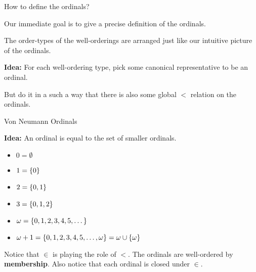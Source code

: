 \documentclass[pdf,final]{prosper}
\newcommand{\skipsmall}{\vspace{1em}}
\begin{document}
\begin{slide}{How to define the ordinals?}

Our immediate goal is to give a precise definition of the ordinals.

\skipsmall

The order-types of the well-orderings are arranged just like our intuitive
picture of the ordinals.

\skipsmall

\textbf{Idea:} For each well-ordering type, pick some canonical representative
to be an ordinal.

\skipsmall

But do it in a such a way that there is also some global $<$ relation on the ordinals.


\end{slide}

\begin{slide}{Von Neumann Ordinals}

\textbf{Idea:} An ordinal is equal to the set of smaller ordinals.


\begin{itemize}
  \item $0 = \emptyset$
  \item $1 = \left\{0\right\}$
  \item $2 = \left\{0,1\right\}$
  \item $3= \left\{0,1,2\right\}$
  \item $\omega = \left\{0,1,2,3,4,5,\dots\right\}$
  \item $\omega+1 = \left\{0,1,2,3,4,5,\dots,\omega\right\}=\omega\cup\left\{\omega\right\}$
\end{itemize}

Notice that $\in$ is playing the role of $<$. The ordinals are well-ordered by
\textbf{membership}.  Also notice that each ordinal is closed under $\in$.



\end{slide}
\end{document}
